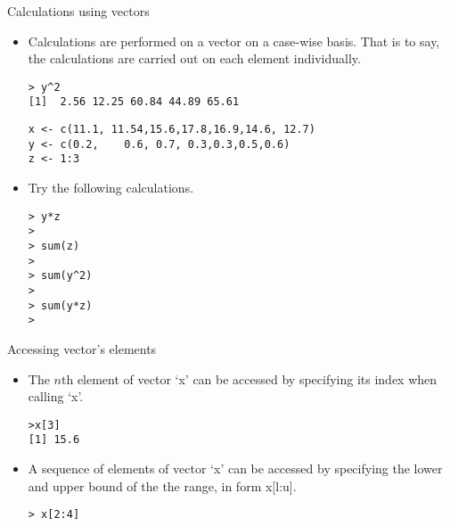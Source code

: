\documentclass{beamer}
\begin{document}
\begin{frame}[fragile]{Calculations using vectors}

\begin{itemize}
\item Calculations are performed on a vector on a case-wise basis.
That is to say, the calculations are carried out on each element individually.
\begin{verbatim}
> y^2
[1]  2.56 12.25 60.84 44.89 65.61
\end{verbatim}

\begin{framed}
\begin{verbatim}
x <- c(11.1, 11.54,15.6,17.8,16.9,14.6, 12.7)
y <- c(0.2,    0.6, 0.7, 0.3,0.3,0.5,0.6)
z <- 1:3
\end{verbatim}
\end{framed}

\end{itemize}
\begin{itemize}
\item Try the following calculations.
\begin{verbatim}
> y*z
>
> sum(z)
>
> sum(y^2)
>
> sum(y*z)
>
\end{verbatim}
\end{itemize}
\end{frame}
\begin{frame}[fragile]{Accessing vector's elements}

\begin{itemize}
\item The $n$th element of vector `x' can be accessed by
specifying its index when calling `x'.
\begin{verbatim}
>x[3]
[1] 15.6
\end{verbatim}

\item A sequence of  elements of vector `x' can be accessed by
specifying the lower and upper bound of the the range, in form
x[l:u].
\begin{verbatim}
> x[2:4]
\end{verbatim}
\end{itemize}
\end{frame}


\end{document}

